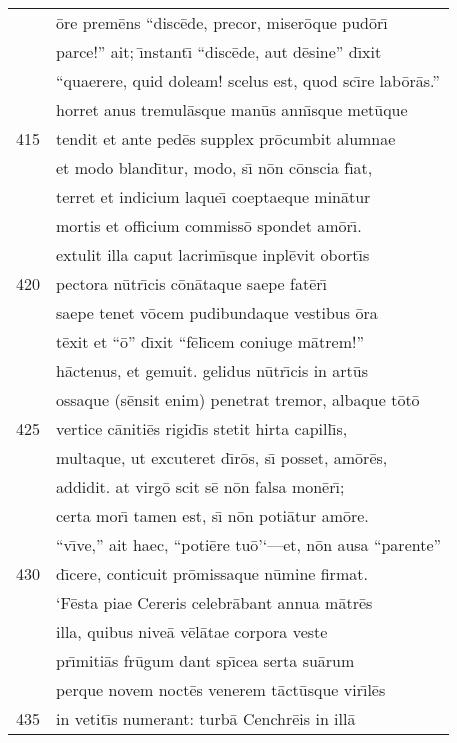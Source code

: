 \documentclass[paper=6in:9in,pagesize=pdftex,
               headinclude=on,footinclude=on,12pt]{scrbook}
\begin{document}
\begin{longtable}[p]{ r l }
 & \=ore prem\=ens ``disc\=ede, precor, miser\=oque pud\=or\={\i}\\ 
 & parce!'' ait; \={\i}nstant\={\i} ``disc\=ede, aut d\=esine'' d\={\i}xit\\ 
 & ``quaerere, quid doleam! scelus est, quod sc\={\i}re lab\=or\=as.''\\ 
 & horret anus tremul\=asque man\=us ann\={\i}sque met\=uque\\ 
415 & tendit et ante ped\=es supplex pr\=ocumbit alumnae\\ 
 & et modo bland\={\i}tur, modo, s\={\i} n\=on c\=onscia f\={\i}at,\\ 
 & terret et indicium laque\={\i} coeptaeque min\=atur\\ 
 & mortis et officium commiss\=o spondet am\=or\={\i}.\\ 
 & extulit illa caput lacrim\={\i}sque inpl\=evit obort\={\i}s\\ 
420 & pectora n\=utr\={\i}cis c\=on\=ataque saepe fat\=er\={\i}\\ 
 & saepe tenet v\=ocem pudibundaque vestibus \=ora\\ 
 & t\=exit et ``\=o'' d\={\i}xit ``f\=el\={\i}cem coniuge m\=atrem!''\\ 
 & h\=actenus, et gemuit. gelidus n\=utr\={\i}cis in art\=us\\ 
 & ossaque (s\=ensit enim) penetrat tremor, albaque t\=ot\=o\\ 
425 & vertice c\=aniti\=es rigid\={\i}s stetit hirta capill\={\i}s,\\ 
 & multaque, ut excuteret d\={\i}r\=os, s\={\i} posset, am\=or\=es,\\ 
 & addidit. at virg\=o scit s\=e n\=on falsa mon\=er\={\i};\\ 
 & certa mor\={\i} tamen est, s\={\i} n\=on poti\=atur am\=ore.\\ 
 & ``v\={\i}ve,'' ait haec, ``poti\=ere tu\=o'`—et, n\=on ausa ``parente''\\ 
430 & d\={\i}cere, conticuit pr\=omissaque n\=umine firmat.\\ 
 & \indent `F\=esta piae Cereris celebr\=abant annua m\=atr\=es\\ 
 & illa, quibus nive\=a v\=el\=atae corpora veste\\ 
 & pr\={\i}miti\=as fr\=ugum dant sp\={\i}cea serta su\=arum\\ 
 & perque novem noct\=es venerem t\=act\=usque vir\={\i}l\=es\\ 
435 & in vetit\={\i}s numerant: turb\=a Cenchr\=eis in ill\=a\\ 

\end{longtable}
\end{document}
